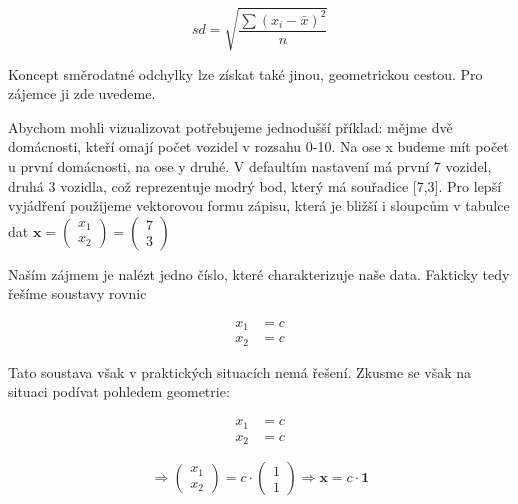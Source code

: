 \documentclass[
  czech,
  11pt,
  letterpaper,
  DIV=11,
  numbers=noendperiod]{scrreprt}
\begin{document}
\[ sd=\sqrt{\frac{\sum (x_i-\bar{x})^2}{n}} \]

Koncept směrodatné odchylky lze získat také jinou, geometrickou cestou.
Pro zájemce ji zde uvedeme.

\begin{tcolorbox}[enhanced jigsaw, arc=.35mm, bottomrule=.15mm, bottomtitle=1mm, breakable, colback=white, colbacktitle=quarto-callout-note-color!10!white, colframe=quarto-callout-note-color-frame, coltitle=black, left=2mm, leftrule=.75mm, opacityback=0, opacitybacktitle=0.6, rightrule=.15mm, title=\textcolor{quarto-callout-note-color}{\faInfo}\hspace{0.5em}{Směrodatná odchylka lineárně algebraicky}, titlerule=0mm, toprule=.15mm, toptitle=1mm]

Abychom mohli vizualizovat potřebujeme jednodušší příklad: mějme dvě
domácnosti, kteří omají počet vozidel v rozsahu 0-10. Na ose x budeme
mít počet u první domácnosti, na ose y druhé. V defaultím nastavení má
první 7 vozidel, druhá 3 vozidla, což reprezentuje modrý bod, který má
souřadice {[}7,3{]}. Pro lepší vyjádření použijeme vektorovou formu
zápisu, která je bližší i sloupcům v tabulce dat
\(\mathbf{x}=\begin{pmatrix} x_1\\ x_2\end{pmatrix}=\begin{pmatrix} 7\\ 3\end{pmatrix}\)

Naším zájmem je nalézt jedno číslo, které charakterizuje naše data.
Fakticky tedy řešíme soustavy rovnic

\begin{align} x_1&=c\\ x_2&=c\end{align}

Tato soustava však v praktických situacích nemá řešení. Zkusme se však
na situaci podívat pohledem geometrie:

\begin{align} x_1&=c \\ x_2&=c \end{align}

\[
  \Longrightarrow \begin{pmatrix} x_1\\x_2 \end{pmatrix} =c \cdot \begin{pmatrix} 1 \\ 1 \end{pmatrix} \Longrightarrow \mathbf{ x}=c \cdot\mathbf{1}
\]


\end{tcolorbox}
\end{document}
